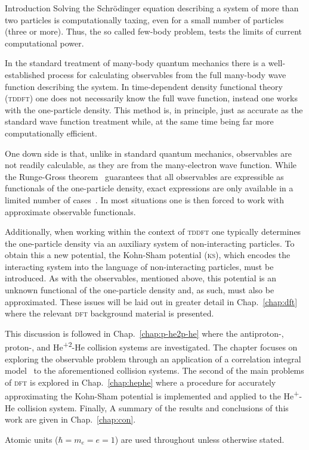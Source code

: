 \documentclass[letterpaper, 11 pt]{report}
\begin{document}
\begin{chapter}{Introduction \label{chap:intro}}
   Solving the Schr\"{o}dinger equation describing a system of more than two particles is
   computationally taxing, even for a small number of particles (three or more). Thus, the so called
   few-body problem, tests the limits of current computational power.

   In the standard treatment of many-body quantum mechanics there is a well-established process for
   calculating observables from the full many-body wave function describing the system. In
   time-dependent density functional theory~\cite{tddft, ullrich} (\textsc{tddft}) one does not
   necessarily know the full wave function, instead one works with the one-particle density. This
   method is, in principle, just as accurate as the standard wave function treatment while, at the
   same time being far more computationally efficient.

   One down side is that, unlike in standard quantum mechanics, observables are not readily calculable,
   as they are from the many-electron wave function. While the Runge-Gross theorem~\cite{rgt} guarantees
   that all observables are expressible as functionals of the one-particle density, exact expressions
   are only available in a limited number of cases~\cite{obs_exac}. In most situations one is then
   forced to work with approximate observable functionals.

   Additionally, when working within the context of \textsc{tddft} one typically determines the
   one-particle density via an auxiliary system of non-interacting particles. To obtain this a new
   potential, the Kohn-Sham potential (\textsc{ks}), which encodes the interacting system into the
   language of non-interacting particles, must be introduced. As with the observables, mentioned above,
   this potential is an unknown functional of the one-particle density and, as such, must also be
   approximated. These issues will be laid out in greater detail in Chap.~\ref{chap:dft} where the
   relevant \textsc{dft} background material is presented.

   This discussion is followed in Chap.~\ref{chap:p-he2p-he} where the antiproton-, proton-, and
   He\textsuperscript{+2}-He collision systems are investigated. The chapter focuses on exploring the
   observable problem through an application of a correlation integral model~\cite{wb} to the
   aforementioned collision systems. The second of the main problems of \textsc{dft} is explored in
   Chap.~\ref{chap:hephe} where a procedure for accurately approximating the Kohn-Sham potential is
   implemented and applied to the He\textsuperscript{+}-He collision system. Finally, A summary of the
   results and conclusions of this work are given in Chap.~\ref{chap:con}.

   Atomic units ($\hbar = m_e = e = 1$) are used throughout unless otherwise stated.

\end{chapter}
\end{document}
